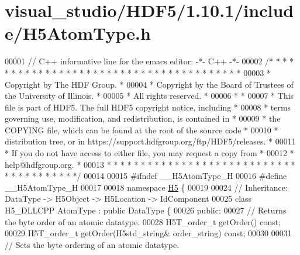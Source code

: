 \hypertarget{visual__studio_2_h_d_f5_21_810_81_2include_2_h5_atom_type_8h_source}{}\section{visual\+\_\+studio/\+H\+D\+F5/1.10.1/include/\+H5\+Atom\+Type.h}
\label{visual__studio_2_h_d_f5_21_810_81_2include_2_h5_atom_type_8h_source}

\begin{DoxyCode}
00001 \textcolor{comment}{// C++ informative line for the emacs editor: -*- C++ -*-}
00002 \textcolor{comment}{/* * * * * * * * * * * * * * * * * * * * * * * * * * * * * * * * * * * * * * *}
00003 \textcolor{comment}{ * Copyright by The HDF Group.                                               *}
00004 \textcolor{comment}{ * Copyright by the Board of Trustees of the University of Illinois.         *}
00005 \textcolor{comment}{ * All rights reserved.                                                      *}
00006 \textcolor{comment}{ *                                                                           *}
00007 \textcolor{comment}{ * This file is part of HDF5.  The full HDF5 copyright notice, including     *}
00008 \textcolor{comment}{ * terms governing use, modification, and redistribution, is contained in    *}
00009 \textcolor{comment}{ * the COPYING file, which can be found at the root of the source code       *}
00010 \textcolor{comment}{ * distribution tree, or in https://support.hdfgroup.org/ftp/HDF5/releases.  *}
00011 \textcolor{comment}{ * If you do not have access to either file, you may request a copy from     *}
00012 \textcolor{comment}{ * help@hdfgroup.org.                                                        *}
00013 \textcolor{comment}{ * * * * * * * * * * * * * * * * * * * * * * * * * * * * * * * * * * * * * * */}
00014 
00015 \textcolor{preprocessor}{#ifndef \_\_H5AtomType\_H}
00016 \textcolor{preprocessor}{#define \_\_H5AtomType\_H}
00017 
00018 \textcolor{keyword}{namespace }\hyperlink{namespace_h5}{H5} \{
00019 
00024 \textcolor{comment}{// Inheritance: DataType -> H5Object -> H5Location -> IdComponent}
00025 \textcolor{keyword}{class }H5\_DLLCPP AtomType : \textcolor{keyword}{public} DataType \{
00026    \textcolor{keyword}{public}:
00027         \textcolor{comment}{// Returns the byte order of an atomic datatype.}
00028         H5T\_order\_t getOrder() \textcolor{keyword}{const};
00029         H5T\_order\_t getOrder(H5std\_string& order\_string) \textcolor{keyword}{const};
00030 
00031         \textcolor{comment}{// Sets the byte ordering of an atomic datatype.}

\end{DoxyCode}
